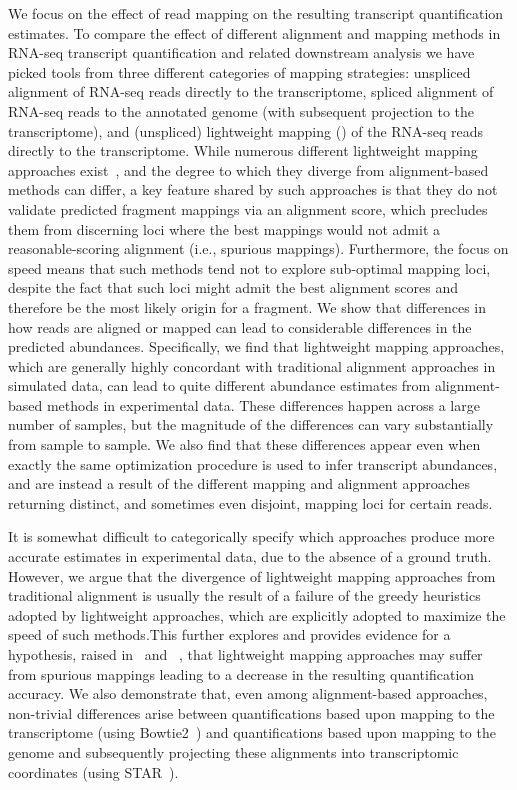 We focus on the effect of read
mapping on the resulting transcript quantification estimates. To compare the
effect of different alignment and mapping methods in RNA-seq transcript
quantification and related downstream analysis we have picked tools from three
different categories of mapping strategies: unspliced alignment of RNA-seq reads
directly to the transcriptome, spliced alignment of RNA-seq reads to the
annotated genome (with subsequent projection to the transcriptome), and
(unspliced) lightweight mapping (\qm) of the RNA-seq reads directly to the
transcriptome. While numerous different lightweight mapping approaches
exist~\citep{sailfish,rnaskim,kallisto,rapmap,fleximer}, and the degree to
which they diverge from alignment-based methods can differ, a key feature
shared by such approaches is that they do not validate predicted fragment mappings
via an alignment score, which precludes them from discerning loci where the best mappings 
would not admit a reasonable-scoring alignment (i.e., spurious mappings). Furthermore, 
the focus on speed means that such methods tend not to explore sub-optimal mapping loci, 
despite the fact that such loci might admit the best alignment scores and therefore be 
the most likely origin for a fragment. We show that differences in how reads are aligned 
or mapped can lead to considerable differences in the predicted abundances. Specifically, we
find that lightweight mapping approaches, which are generally highly
concordant with traditional alignment approaches in simulated data, can lead to
quite different abundance estimates from alignment-based methods in experimental
data. These differences happen across a large number
of samples, but the magnitude of the differences can vary substantially from sample to sample. We
also find that these differences appear even when exactly the same optimization procedure
is used to infer transcript abundances, and are instead a result of the different
mapping and alignment approaches returning distinct, and sometimes even
disjoint, mapping loci for certain reads.

It is somewhat difficult to categorically specify which approaches produce more accurate 
estimates in experimental data, due to the absence of a ground truth. However,
we argue that the divergence of lightweight mapping approaches from traditional
alignment is usually the result of a failure of the greedy heuristics adopted by
lightweight approaches, which are explicitly adopted to maximize the speed of
such methods.This further explores and provides evidence for a hypothesis, raised
in~\citet{selaln} and ~\citet{heraem}, that lightweight mapping approaches may suffer from
spurious mappings leading to a decrease in the resulting quantification
accuracy. We also demonstrate that, even among alignment-based approaches,
non-trivial differences arise between quantifications based upon mapping to the
transcriptome (using Bowtie2~\citep{bowtie2}) and quantifications based upon
mapping to the genome and subsequently projecting these alignments into
transcriptomic coordinates (using STAR~\citep{star}).

